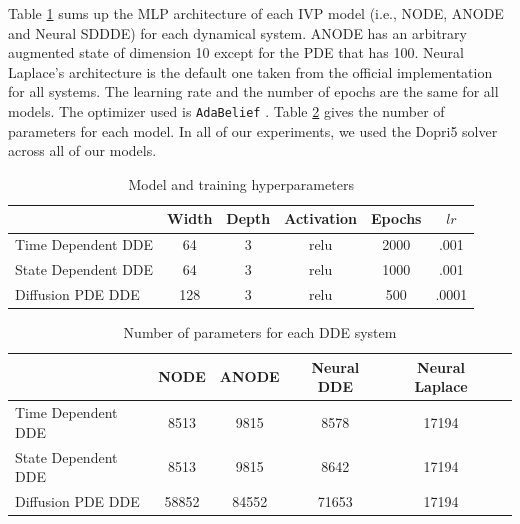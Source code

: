 \documentclass[pmlr]{jmlr}%
\begin{document}

Table \ref{hyper_ivp} sums up the MLP architecture of each IVP model (i.e., NODE, ANODE and Neural SDDDE) for each dynamical system. ANODE has an arbitrary augmented state of dimension 10 except for the PDE that has 100. Neural Laplace's architecture is the default one taken from the official implementation for all systems. The learning rate and the number of epochs are the same for all models. The optimizer used is \verb?AdaBelief? \citep{zhuang2020adabelief}. Table \ref{number_params} gives the number of parameters for each model. In all of our experiments, we used the Dopri5 solver across all of our models.

\begin{table}[h]
\vskip 0.15in
\begin{center}
\begin{small}
\begin{tabular}{lccccc}
\toprule
 & Width & Depth & Activation & Epochs & $lr$ \\
\hline
Time Dependent DDE & 64 & 3 & relu & 2000 & .001 \\
State Dependent DDE & 64 & 3 & relu & 1000 & .001 \\
Diffusion PDE DDE & 128 & 3 & relu & 500 & .0001 \\
\bottomrule
\end{tabular}
\end{small}
\caption{Model and training hyperparameters}
\label{hyper_ivp}
\end{center}
\end{table}


\begin{table}[H]
\vskip 0.15in
\begin{center}
\begin{small}
\begin{tabular}{lccccr}
\toprule
& NODE & ANODE & Neural DDE & Neural Laplace \\
\hline
Time Dependent DDE & 8513 & 9815 & 8578 & 17194 \\
State Dependent DDE & 8513 & 9815 & 8642 & 17194 \\
Diffusion PDE DDE & 58852 & 84552 & 71653 & 17194 \\
\bottomrule
\end{tabular}
\end{small}
\caption{Number of parameters for each DDE system}
\label{number_params}
\end{center}
\end{table}
\end{document}
